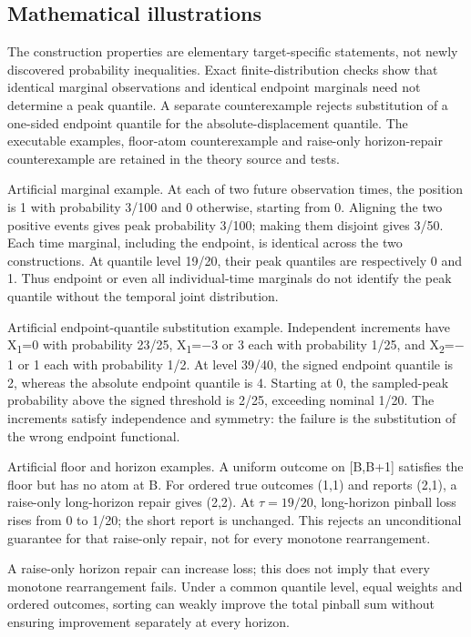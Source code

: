 \documentclass[11pt,a4paper]{article}
\begin{document}
\subsection*{Mathematical illustrations}
The construction properties are elementary target-specific statements, not newly discovered probability inequalities. Exact finite-distribution checks show that identical marginal observations and identical endpoint marginals need not determine a peak quantile. A separate counterexample rejects substitution of a one-sided endpoint quantile for the absolute-displacement quantile. The executable examples, floor-atom counterexample and raise-only horizon-repair counterexample are retained in the theory source and tests.

Artificial marginal example. At each of two future observation times, the position is 1 with probability 3/100 and 0 otherwise, starting from 0. Aligning the two positive events gives peak probability 3/100; making them disjoint gives 3/50. Each time marginal, including the endpoint, is identical across the two constructions. At quantile level 19/20, their peak quantiles are respectively 0 and 1. Thus endpoint or even all individual-time marginals do not identify the peak quantile without the temporal joint distribution.

Artificial endpoint-quantile substitution example. Independent increments have X\textsubscript{1}=0 with probability 23/25, X\textsubscript{1}=\(-\)3 or 3 each with probability 1/25, and X\textsubscript{2}=\(-\)1 or 1 each with probability 1/2. At level 39/40, the signed endpoint quantile is 2, whereas the absolute endpoint quantile is 4. Starting at 0, the sampled-peak probability above the signed threshold is 2/25, exceeding nominal 1/20. The increments satisfy independence and symmetry: the failure is the substitution of the wrong endpoint functional.

Artificial floor and horizon examples. A uniform outcome on [B,B+1] satisfies the floor but has no atom at B. For ordered true outcomes (1,1) and reports (2,1), a raise-only long-horizon repair gives (2,2). At \(\tau=19/20\), long-horizon pinball loss rises from 0 to 1/20; the short report is unchanged. This rejects an unconditional guarantee for that raise-only repair, not for every monotone rearrangement.

A raise-only horizon repair can increase loss; this does not imply that every monotone rearrangement fails. Under a common quantile level, equal weights and ordered outcomes, sorting can weakly improve the total pinball sum without ensuring improvement separately at every horizon.
\end{document}
